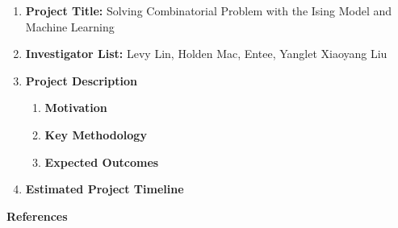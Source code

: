 \documentclass{article}
\begin{document}
\begin{enumerate}
\item \textbf{Project Title:} Solving Combinatorial Problem with the Ising Model and Machine Learning

\item \textbf{Investigator List:} Levy Lin, Holden Mac, Entee, Yanglet Xiaoyang Liu

\item \textbf{Project Description}
	\begin{enumerate}
		\item \textbf{Motivation}

		\item \textbf{Key Methodology}

		\item \textbf{Expected Outcomes}

		
	\end{enumerate}

\item \textbf{Estimated Project Timeline}
\end{enumerate}

\textbf{References}
  
\end{document}
